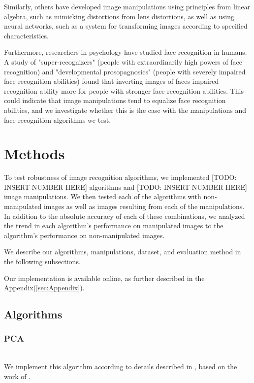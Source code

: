 \documentclass[pageno]{cos429}
\begin{document}
Similarly, others have developed image manipulations using principles from linear algebra, such as mimicking distortions from lens distortions, as well as using neural networks, such as a system for transforming images according to specified characteristics\cite{savarese_camera_2015}\cite{upchurch_deep_2016}.

Furthermore, researchers in psychology have studied face recognition in humans. A study of "super-recognizers" (people with extraordinarily high powers of face recognition) and "developmental prosopagnosics" (people with severely impaired face recognition abilities) found that inverting images of faces impaired recognition ability more for people with stronger face recognition abilities\cite{russell_super-recognizers:_2009}. This could indicate that image manipulations tend to equalize face recognition abilities, and we investigate whether this is the case with the manipulations and face recognition algorithms we test.

\section{Methods}
To test robustness of image recognition algorithms, we implemented [TODO: INSERT NUMBER HERE] algorithms and [TODO: INSERT NUMBER HERE] image manipulations. We then tested each of the algorithms with non-manipulated images as well as images resulting from each of the manipulations. In addition to the absolute accuracy of each of these combinations, we analyzed the trend in each algorithm's performance on manipulated images to the algorithm's performance on non-manipulated images.

We describe our algorithms, manipulations, dataset, and evaluation method in the following subsections.

Our implementation is available online, as further described in the Appendix(\ref{sec:Appendix}).

\subsection{Algorithms}
\subsubsection{PCA}\hspace*{\fill} \\
We implement this algorithm according to details described in \cite{vidal_eigenfaces_2008}, based on the work of \cite{turk_eigenfaces_1991}.
\end{document}
